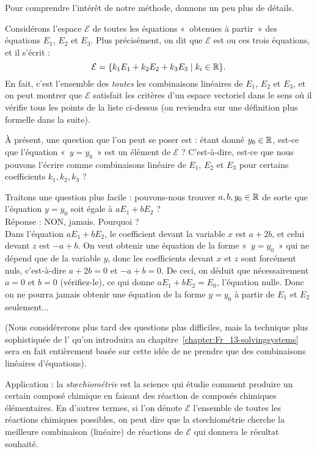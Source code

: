 
Pour comprendre l'intérêt de notre méthode, donnons un peu plus de détails.

Considérons l'espace $\mathcal{E}$ de toutes les équations «~obtenues à partir~»   des  équations $E_1$, $E_2$ et $E_3$. Plus précisément, on dit que $\mathcal E$ est  ou  ces trois équations, et il s'écrit :
$$
\mathcal{E} = \{ k_1E_1 + k_2 E_2 + k_3 E_3 \;| \; k_i \in \mathbb{R}\}.
$$
En fait, c'est l'ensemble des \emph{toutes} les combinaisons linéaires  de $E_1$, $E_2$ et $E_3$, et on peut montrer que  $\mathcal{E}$ satisfait les crit\`eres d'un espace vectoriel dans le
sens où il vérifie tous les points de la liste ci-dessus (on reviendra sur une définition plus formelle dans la suite).

À présent, une question que l'on peut se poser est : étant donné $y_0\in\mathbb{R}$, est-ce que l'équation «~$y=y_0$~» est un élément de $\mathcal E$ ?
C'est-à-dire, est-ce que nous pouvons l'écrire comme combinaisons linéaire de $E_1$, $E_2$ et $E_3$ pour certains coefficients $k_1, k_2, k_3$ ?

\begin{myexample} Traitons une question plus facile :
pouvons-nous trouver $a,b,y_0\in\mathbb{R}$ de sorte que l'équation $y=y_0$ soit égale à $aE_1+bE_2$ ? \\ 
Réponse : NON, jamais.  Pourquoi ?\\
Dans l'équation $aE_1+bE_2$, le coefficient devant la variable $x$ est $a+2b$, et celui devant
$z$ est $-a+b$. On veut obtenir une équation de la forme «~$y=y_0$~» qui ne dépend que de la variable $y$, donc les coefficients devant $x$ et $z$ sont forcément nuls, c'est-à-dire $a+2b=0$ et $-a+b=0$. De ceci, on déduit que nécessairement $a=0$ et $b=0$ (vérifiez-le), ce qui donne
 $aE_1+bE_2 = E_0$, l'équation nulle. Donc on ne pourra jamais obtenir une équation de la forme $y=y_0$ à partir de $E_1$ et $E_2$ seulement... 
\end{myexample}

(Nous considérerons plus tard des questions plus difficiles,
mais la technique plus sophistiquée de l' qu'on introduira au chapitre~\ref{chapter:Fr_13-solvingsystems}
sera en fait entièrement basée sur cette idée de ne prendre que des combinaisons linéaires
d'équations).

Application : la \emph{stœchiométrie} est la science qui étudie comment
produire un certain composé chimique en faisant des réaction de composés chimiques 
 élémentaires. En d'autres termes, si l'on dénote $\mathcal{E}$
l'ensemble de toutes les réactions chimiques possibles, on peut dire que la stœchiométrie
cherche la meilleure combinaison (linéaire) de réactions de $\mathcal E$ qui donnera le résultat souhaité.

